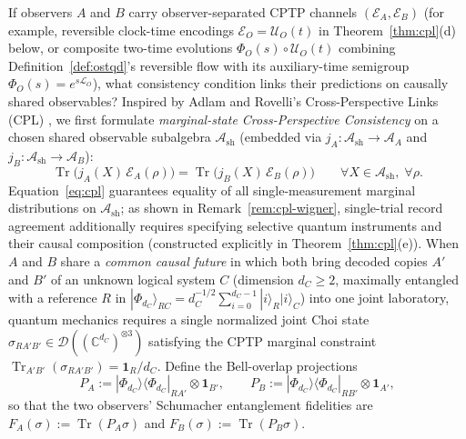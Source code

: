 \documentclass[11pt,a4paper]{article}
\theoremstyle{definition}
\theoremstyle{remark}
\newcommand{\Tr}{\operatorname{Tr}}
\newcommand{\cA}{\mathcal{A}}
\newcommand{\cD}{\mathcal{D}}
\newcommand{\cL}{\mathcal{L}}
\newcommand{\cE}{\mathcal{E}}
\newcommand{\cU}{\mathcal{U}}
\newcommand{\bbC}{\mathbb{C}}
\newcommand{\1}{\mathbf{1}}
\begin{document}
If observers $A$ and $B$ carry observer-separated CPTP channels $(\cE_A, \cE_B)$ (for example, reversible clock-time encodings $\cE_O = \cU_O(t)$ in Theorem~\ref{thm:cpl}(d) below, or composite two-time evolutions $\Phi_O(s)\circ\cU_O(t)$ combining Definition~\ref{def:ostqd}'s reversible flow with its auxiliary-time semigroup $\Phi_O(s) = e^{s\cL_O}$), what consistency condition links their predictions on causally shared observables? Inspired by Adlam and Rovelli's Cross-Perspective Links (CPL) \cite[Def.~4.1]{AdlamRovelli2022}, we first formulate \emph{marginal-state Cross-Perspective Consistency} on a chosen shared observable subalgebra $\cA_{\mathrm{sh}}$ (embedded via $j_A: \cA_{\mathrm{sh}} \to \cA_A$ and $j_B: \cA_{\mathrm{sh}} \to \cA_B$):
\begin{equation}\label{eq:cpl}
  \Tr\bigl(j_A(X)\,\cE_A(\rho)\bigr) = \Tr\bigl(j_B(X)\,\cE_B(\rho)\bigr) \qquad \forall X \in \cA_{\mathrm{sh}},\;\forall \rho.
\end{equation}
Equation~\eqref{eq:cpl} guarantees equality of all single-measurement marginal distributions on $\cA_{\mathrm{sh}}$; as shown in Remark~\ref{rem:cpl-wigner}, single-trial record agreement additionally requires specifying selective quantum instruments and their causal composition (constructed explicitly in Theorem~\ref{thm:cpl}(e)).
When $A$ and $B$ share a \emph{common causal future} in which both bring decoded copies $A'$ and $B'$ of an unknown logical system $C$ (dimension $d_C \ge 2$, maximally entangled with a reference $R$ in $|\Phi_{d_C}\rangle_{RC} = d_C^{-1/2}\sum_{i=0}^{d_C-1} |i\rangle_R |i\rangle_C$) into one joint laboratory, quantum mechanics requires a single normalized joint Choi state $\sigma_{RA'B'} \in \cD((\bbC^{d_C})^{\otimes 3})$ satisfying the CPTP marginal constraint $\Tr_{A'B'}(\sigma_{RA'B'}) = \1_R / d_C$. Define the Bell-overlap projections
\begin{equation}
  P_A := |\Phi_{d_C}\rangle\langle\Phi_{d_C}|_{RA'} \otimes \1_{B'}, \qquad
  P_B := |\Phi_{d_C}\rangle\langle\Phi_{d_C}|_{RB'} \otimes \1_{A'},
\end{equation}
so that the two observers' Schumacher entanglement fidelities \cite{Schumacher1996} are $F_A(\sigma) := \Tr(P_A\sigma)$ and $F_B(\sigma) := \Tr(P_B\sigma)$.
\end{document}
